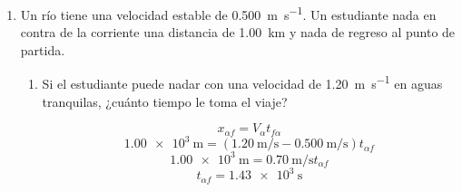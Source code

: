 \documentclass[../practica.root.tex]{subfiles}
\begin{document}
\begin{enumerate}
\begin{enumerate}
		      \item ¿Qué ángulo ha recorrido el CD en su giro mientras alcanza su velocidad máxima?

		            \[\theta_f=\theta_i+\omega_it_f+\frac{1}{2}\alpha{t_f}^2\]
		            \[\theta_f=\frac{1}{2}\cdot\SI{35,2}{\radian\per\second\squared}\cdot(\SI{0,892}{\second})^2=\boxed{\SI{14,0}{\radian}}\]

		      \item Si el radio del CD es \SI{4,45}{\cm}, encuentre la velocidad tangencial de un microbio que se mueve sobre el borde del CD cuando el tiempo es \SI{0,892}{\second}.

		            \[V_{tf}=\omega_f r=\boxed{\SI{1,40}{\meter\per\second}}\]

		      \item ¿Cuál es la magnitud de la aceleración tangencial del microbio en el tiempo dado?

		            \[a_{tf}=\alpha_f r=\boxed{\SI{1,57}{\meter\per\second\squared}}\]
	      \end{enumerate}

	\item Un río tiene una velocidad estable de \SI{0,500}{\meter\per\second}. Un estudiante nada en contra de la corriente una distancia de \SI{1,00}{\km} y nada de regreso al punto de partida.

	      \begin{center}
	      \end{center}

	      \begin{enumerate}
		      \item Si el estudiante puede nadar con una velocidad de \SI{1,20}{\meter\per\second} en aguas tranquilas, ¿cuánto tiempo le toma el viaje?

		            \begin{multicols}{2}
			            \[x_{\alpha f}=V_{\alpha}t_{f\alpha}\]
			            \[\SI{1,00e3}{\meter}=\left(\SI{1,20}{\meter\per\second}-\SI{0,500}{\meter\per\second}\right)t_{\alpha f}\]
			            \[\SI{1,00e3}{\meter}=\SI{0,70}{\meter\per\second}t_{\alpha f}\]
			            \[t_{\alpha f}=\SI{1,43e3}{\second}\]


\end{multicols}
\end{enumerate}
\end{enumerate}
\end{document}
